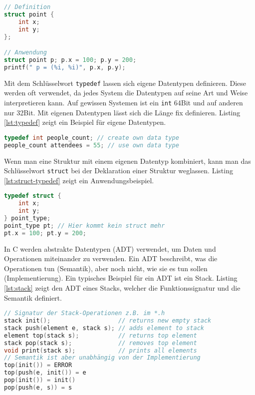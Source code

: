 \begin{lstlisting}[language=C, caption=Strukturen, label=lst:struct]
// Definition
struct point {
	int x;
	int y;
};

// Anwendung
struct point p; p.x = 100; p.y = 200;
printf(" p = (%i, %i)", p.x, p.y);
\end{lstlisting}

Mit dem Schlüsselwort \verb|typedef| lassen sich eigene Datentypen definieren. Diese werden oft verwendet, da jedes System die Datentypen auf seine Art und Weise interpretieren kann. Auf gewissen Systemen ist ein \verb|int| 64Bit und auf anderen nur 32Bit. Mit eigenen Datentypen lässt sich die Länge fix definieren. Listing \ref{lst:typedef} zeigt ein Beispiel für eigene Datentypen.

\begin{lstlisting}[language=C, caption=Eigene Typen, label=lst:typedef]
typedef int people_count; // create own data type
people_count attendees = 55; // use own data type
\end{lstlisting}

Wenn man eine Struktur mit einem eigenen Datentyp kombiniert, kann man das Schlüsselwort \verb|struct| bei der Deklaration einer Struktur weglassen. Listing \ref{lst:struct-typedef} zeigt ein Anwendungsbeispiel.

\begin{lstlisting}[language=C, caption=Struktur als eigener Datentypen, label=lst:struct-typedef]
typedef struct {
	int x;
	int y;
} point_type;
point_type pt; // Hier kommt kein struct mehr
pt.x = 100; pt.y = 200;
\end{lstlisting}

In C werden abstrakte Datentypen (ADT) verwendet, um Daten und Operationen miteinander zu verwenden. Ein ADT beschreibt, was die Operationen tun (Semantik), aber noch nicht, wie sie es tun sollen (Implementierung). Ein typisches Beispiel für ein ADT ist ein Stack. Listing \ref{lst:stack} zeigt den ADT eines Stacks, welcher die Funktionssignatur und die Semantik definiert.

\begin{lstlisting}[language=C, caption=ADT Stack, label=lst:stack]
// Signatur der Stack-Operationen z.B. im *.h
stack init(); 					// returns new empty stack
stack push(element e, stack s); // adds element to stack
element top(stack s); 			// returns top element
stack pop(stack s); 			// removes top element
void print(stack s); 			// prints all elements
// Semantik ist aber unabhängig von der Implementierung
top(init()) = ERROR
top(push(e, init()) = e
pop(init()) = init()
pop(push(e, s)) = s
\end{lstlisting}

